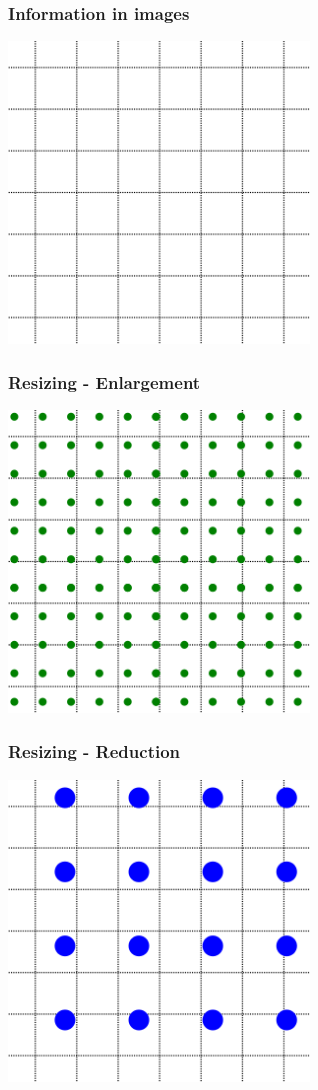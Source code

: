 \documentclass{beamer}
\begin{document}
\begin{frame}
\frametitle{Information in images}
\centering
\includegraphics[width=0.6\textwidth]{resize3.png}
\end{frame}


\begin{frame}
\frametitle{Resizing - Enlargement}
\centering
\includegraphics[width=0.6\textwidth]{resize4.png}
\end{frame}


\begin{frame}
\centering
\frametitle{Resizing - Reduction}
\includegraphics[width=0.6\textwidth]{resize5.png}
\end{frame}
\end{document}
